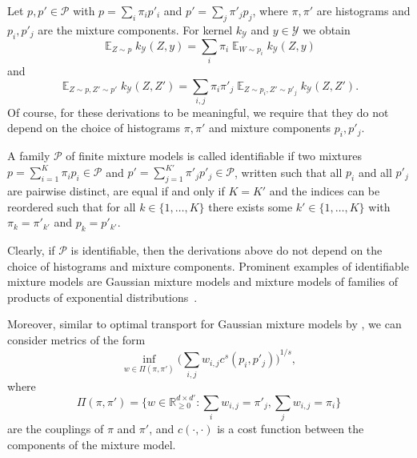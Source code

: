 \documentclass{article}
\DeclareMathOperator{\Exp}{\mathbb{E}}
\begin{document}
Let $p, p' \in \mathcal{P}$ with $p = \sum_i \pi_i p'_i$ and
$p' = \sum_j \pi'_j p_j$, where $\pi, \pi'$ are histograms and $p_i, p'_j$
are the mixture components. For kernel $k_{\mathcal{Y}}$ and $y \in \mathcal{Y}$ we obtain
\begin{equation*}
    \Exp_{Z \sim p} k_{\mathcal{Y}}(Z, y) = \sum_i \pi_i \Exp_{W \sim p_i} k_{\mathcal{Y}}(Z, y)
\end{equation*}
and
\begin{equation*}
    \Exp_{Z \sim p, Z' \sim p'} k_{\mathcal{Y}}(Z, Z') = \sum_{i,j} \pi_i \pi'_j \Exp_{Z \sim p_i, Z' \sim p'_j} k_{\mathcal{Y}}(Z, Z').
\end{equation*}
Of course, for these derivations to be meaningful, we require that they do not depend on the
choice of histograms $\pi, \pi'$ and mixture components $p_i, p'_j$.

\begin{definition}\label{def:identifiable}
    A family $\mathcal{P}$ of finite mixture models is called identifiable if two mixtures
    $p = \sum_{i=1}^{K} \pi_i p_i \in \mathcal{P}$ and $p' = \sum_{j=1}^{K'} \pi'_j p'_j \in \mathcal{P}$,
    written such that all $p_i$ and all $p'_j$ are pairwise distinct, are equal if and only if $K = K'$ and
    the indices can be reordered such that for all $k \in \{1, \ldots, K\}$ there exists
    some $k' \in \{1, \ldots, K\}$ with $\pi_k = \pi'_{k'}$ and $p_k = p'_{k'}$.
\end{definition}

Clearly, if $\mathcal{P}$ is identifiable, then the derivations above do not depend on the choice
of histograms and mixture components. Prominent examples of identifiable mixture models are
Gaussian mixture models and mixture models of families of products of exponential
distributions~\citep{Yakowitz1968}.

Moreover, similar to optimal transport for Gaussian mixture models
by \citet{Delon2019,Chen2019,Chen2020}, we can consider metrics of the form
\begin{equation*}
    \inf_{w \in \Pi(\pi, \pi')} {\bigg(\sum_{i,j} w_{i,j} c^s(p_i, p'_j)\bigg)}^{1/s},
\end{equation*}
where
\begin{equation*}
    \Pi(\pi, \pi') = \bigg\{ w \in \mathbb{R}_{\geq 0}^{d \times d'} \colon \sum_i w_{i,j} = \pi'_j, \sum_j w_{i,j} = \pi_i\bigg\}
\end{equation*}
are the couplings of $\pi$ and $\pi'$, and $c(\cdot, \cdot)$ is a cost function
between the components of the mixture model.
\end{document}
